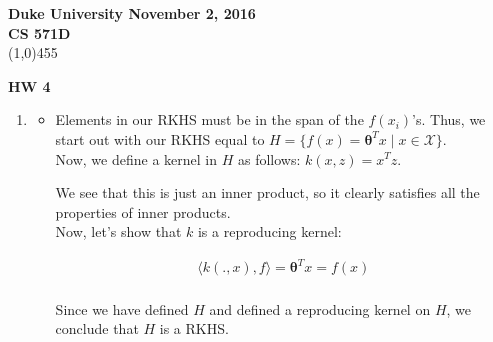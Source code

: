 \documentclass[11pt]{article}
\newcommand{\T}{\bm{\theta}}
\begin{document}
\noindent \textbf{Duke University  \hfill  November 2, 2016} \\
\noindent \textbf{CS 571D} \\
\line(1,0){455}
    
\begin{center}
\Large{{\bf HW 4}}\\
\end{center}

\begin{enumerate}

\item \begin{itemize}

\item Elements in our RKHS must be in the span of the $f(x_i)$'s. Thus, we start out with our RKHS equal to $H = \{ f(x) = \T^Tx\mid x \in \mathcal{X} \}$. \\ 

Now, we define a kernel in $H$ as follows: $k(x,z) = x^Tz$.

We see that this is just an inner product, so it clearly satisfies all the properties of inner products. \\ 

Now, let's show that $k$ is a reproducing kernel: 

\begin{align*}
\langle k(.,x),f \rangle = \T^Tx = f(x)\\
\end{align*}

Since we have defined $H$ and defined a reproducing kernel on $H$, we conclude that $H$ is a RKHS.


\end{itemize}
\end{enumerate}
\end{document}
